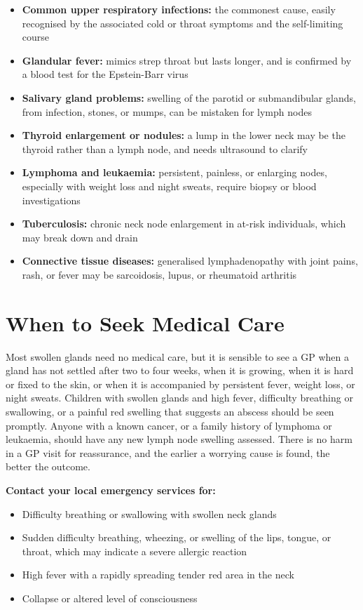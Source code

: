 \begin{itemize}
    \item \textbf{Common upper respiratory infections:} the commonest cause, easily recognised by the associated cold or throat symptoms and the self-limiting course
    \item \textbf{Glandular fever:} mimics strep throat but lasts longer, and is confirmed by a blood test for the Epstein-Barr virus
    \item \textbf{Salivary gland problems:} swelling of the parotid or submandibular glands, from infection, stones, or mumps, can be mistaken for lymph nodes
    \item \textbf{Thyroid enlargement or nodules:} a lump in the lower neck may be the thyroid rather than a lymph node, and needs ultrasound to clarify
    \item \textbf{Lymphoma and leukaemia:} persistent, painless, or enlarging nodes, especially with weight loss and night sweats, require biopsy or blood investigations
    \item \textbf{Tuberculosis:} chronic neck node enlargement in at-risk individuals, which may break down and drain
    \item \textbf{Connective tissue diseases:} generalised lymphadenopathy with joint pains, rash, or fever may be sarcoidosis, lupus, or rheumatoid arthritis
\end{itemize}

\section*{When to Seek Medical Care}
Most swollen glands need no medical care, but it is sensible to see a GP when a gland has not settled after two to four weeks, when it is growing, when it is hard or fixed to the skin, or when it is accompanied by persistent fever, weight loss, or night sweats. Children with swollen glands and high fever, difficulty breathing or swallowing, or a painful red swelling that suggests an abscess should be seen promptly. Anyone with a known cancer, or a family history of lymphoma or leukaemia, should have any new lymph node swelling assessed. There is no harm in a GP visit for reassurance, and the earlier a worrying cause is found, the better the outcome.

\textbf{Contact your local emergency services for:}
\begin{itemize}
    \item Difficulty breathing or swallowing with swollen neck glands
    \item Sudden difficulty breathing, wheezing, or swelling of the lips, tongue, or throat, which may indicate a severe allergic reaction
    \item High fever with a rapidly spreading tender red area in the neck
    \item Collapse or altered level of consciousness
\end{itemize}

